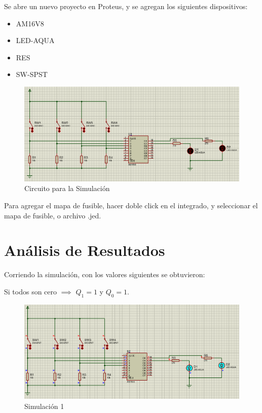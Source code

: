 \documentclass{article}
\begin{document}
    Se abre un nuevo proyecto en Proteus, y se agregan los siguientes
    dispositivos:

    \begin{itemize}
        \item AM16V8
        \item LED-AQUA
        \item RES
        \item SW-SPST
    \end{itemize}

    \begin{figure}[H]
        \centering
        \includegraphics[width=0.5\paperwidth]{images/proteus-sim-circuit}
        \caption{Circuito para la Simulación}
    \end{figure}

    Para agregar el mapa de fusible, hacer doble click en el integrado, y
    seleccionar el mapa de fusible, o archivo .jed.

    \section{Análisis de Resultados}\label{sec:análisis-de-resultados}

    Corriendo la simulación, con los valores siguientes se obtuvieron:

    \bigbreak

    Si todos son cero $\implies$ $Q_1 = 1$ y $Q_0 = 1$.

    \begin{figure}[H]
        \centering
        \includegraphics[width=0.5\paperwidth]{images/proteus-sim-1}
        \caption{Simulación 1}
    \end{figure}
\end{document}

